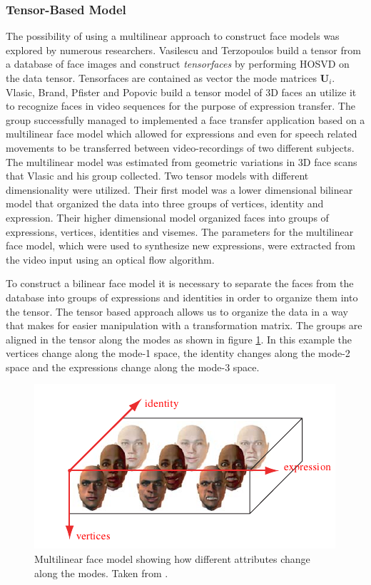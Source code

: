 \documentclass[11pt,a4paper,twoside]{report}
\begin{document}
\subsubsection{Tensor-Based Model}\label{works}
The possibility of using a multilinear approach to construct face models was explored
by numerous researchers. Vasilescu and Terzopoulos \cite{Ter1} build a tensor from a
database of face images and construct \textit{tensorfaces} by performing HOSVD
on the data tensor. Tensorfaces are contained as vector the mode matrices
$\mathbf{U}_i$. Vlasic, Brand, Pfister and Popovic \cite{faceTransfer05} build a
tensor model of 3D faces an utilize it to recognize faces in video sequences for
the purpose of expression transfer. The group
successfully managed to implemented a face transfer application based on a
multilinear face model which allowed for expressions and even for speech related
movements to be transferred between video-recordings of two different subjects. The multilinear
model was estimated from geometric variations in 3D face scans that Vlasic and
his group collected. Two tensor models with different dimensionality were utilized. Their first model was a lower dimensional bilinear model that organized the data into three
groups of vertices, identity and expression. Their higher dimensional model
organized faces into groups of expressions, vertices, identities and visemes. The parameters for the multilinear face model, which were used to synthesize new expressions, were
extracted from the video input using an optical flow algorithm.

To construct a bilinear face model it is necessary to separate the faces from the
database into groups of expressions and identities in order to organize them
into the tensor. The tensor based approach allows us to organize
the data in a way that makes for easier manipulation with a transformation
matrix. The groups are aligned in the tensor along the modes as shown in figure
\ref{gr:tensor}. In this example the vertices change along the mode-1 space, the identity changes
along the mode-2 space and the expressions change along the mode-3 space. 
\begin{figure}[H]
\centering
\includegraphics[scale=1]{images/modes_faces.png}
\caption{Multilinear face model showing how different attributes change along
  the modes. Taken from \cite{faceTransfer05}. }
\label{gr:tensor}
\end{figure}
\end{document}
